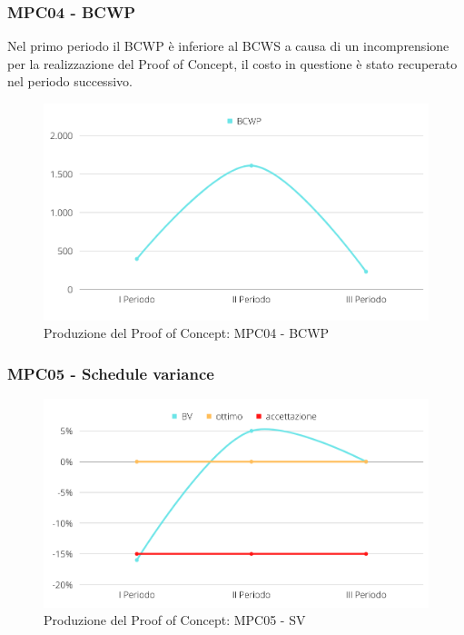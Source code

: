 \subsubsection{MPC04 - BCWP}
Nel primo periodo il BCWP è inferiore al BCWS a causa di un incomprensione per la realizzazione del Proof of Concept, il costo in questione è stato recuperato nel periodo successivo.
\begin{figure}[H]
    \centering
    \includegraphics[scale=0.50]{Sezioni/images/poc-BCWP.png}
    \caption{Produzione del Proof of Concept: MPC04 - BCWP}
\end{figure}

\subsubsection{MPC05 - Schedule variance}
\begin{figure}[H]
    \centering
    \includegraphics[scale=0.50]{Sezioni/images/poc-SV.png}
    \caption{Produzione del Proof of Concept: MPC05 - SV}
\end{figure}

